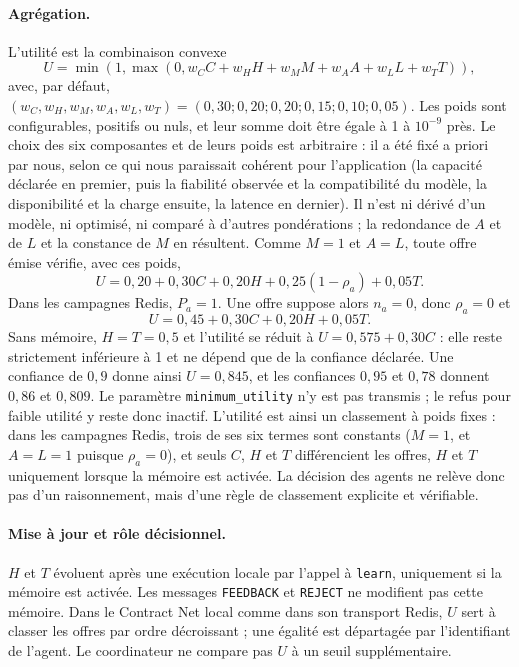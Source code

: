 \paragraph{Agrégation.}
L'utilité est la combinaison convexe
\[
U=\min\!\left(1,\max\!\left(0,
w_CC+w_HH+w_MM+w_AA+w_LL+w_TT\right)\right),
\]
avec, par défaut,
$(w_C,w_H,w_M,w_A,w_L,w_T)=(0{,}30;0{,}20;0{,}20;0{,}15;0{,}10;0{,}05)$.
Les poids sont configurables, positifs ou nuls, et leur somme doit être égale à 1 à
$10^{-9}$ près. Le choix des six composantes et de leurs poids est arbitraire : il a été
fixé a priori par nous, selon ce qui nous paraissait cohérent pour l'application (la
capacité déclarée en premier, puis la fiabilité observée et la compatibilité du modèle, la
disponibilité et la charge ensuite, la latence en dernier). Il n'est ni dérivé d'un modèle,
ni optimisé, ni comparé à d'autres pondérations ; la redondance de $A$ et de $L$ et la
constance de $M$ en résultent. Comme $M=1$ et $A=L$, toute offre émise vérifie, avec ces poids,
\[
U=0{,}20+0{,}30C+0{,}20H+0{,}25(1-\rho_a)+0{,}05T.
\]
Dans les campagnes Redis, $P_a=1$. Une offre suppose alors $n_a=0$, donc $\rho_a=0$ et
\[
U=0{,}45+0{,}30C+0{,}20H+0{,}05T.
\]
Sans mémoire, $H=T=0{,}5$ et l'utilité se réduit à $U=0{,}575+0{,}30C$ : elle reste
strictement inférieure à 1 et ne dépend que de la confiance déclarée. Une confiance de
$0{,}9$ donne ainsi $U=0{,}845$, et les confiances $0{,}95$ et $0{,}78$ donnent
$0{,}86$ et $0{,}809$.
Le paramètre \texttt{minimum\_utility} n'y est pas transmis ; le refus pour faible utilité
y reste donc inactif. L'utilité est ainsi un classement à poids fixes : dans les campagnes
Redis, trois de ses six termes sont constants ($M=1$, et $A=L=1$ puisque $\rho_a=0$), et
seuls $C$, $H$ et $T$ différencient les offres, $H$ et $T$ uniquement lorsque la mémoire est
activée. La décision des agents ne relève donc pas d'un raisonnement, mais d'une règle de
classement explicite et vérifiable.

\paragraph{Mise à jour et rôle décisionnel.}
$H$ et $T$ évoluent après une exécution locale par l'appel à \texttt{learn}, uniquement
si la mémoire est activée. Les messages \texttt{FEEDBACK} et \texttt{REJECT} ne modifient
pas cette mémoire. Dans le Contract Net local comme dans son transport Redis, $U$ sert à
classer les offres par ordre décroissant ; une égalité est départagée par l'identifiant de
l'agent. Le coordinateur ne compare pas $U$ à un seuil supplémentaire.


